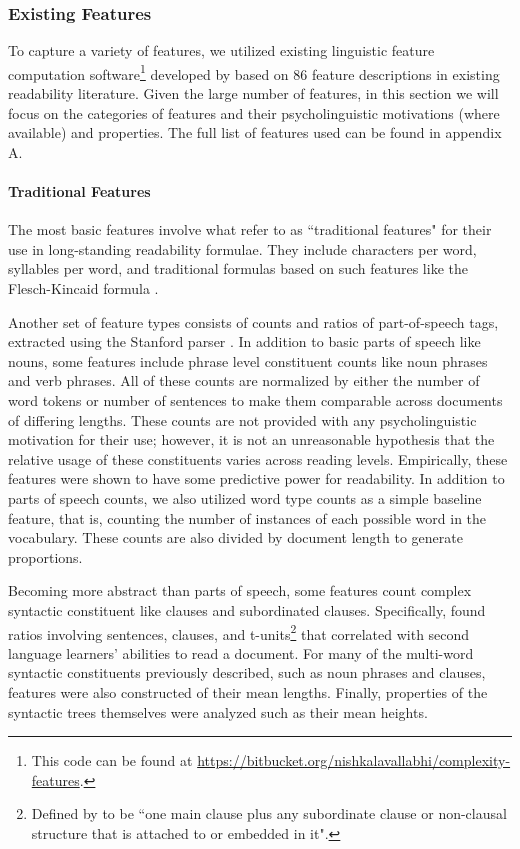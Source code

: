 \documentclass[11pt,a4paper]{article}
\theoremstyle{definition}
\begin{document}
\subsubsection{Existing Features}
To capture a variety of features, we utilized existing linguistic feature computation software\footnote{This code can be found at \url{https://bitbucket.org/nishkalavallabhi/complexity-features}.} developed by \citet{vajjalabalakrishnaAnalyzingTextComplexity2015} based on 86 feature descriptions in existing readability literature. Given the large number of features, in this section we will focus on the categories of features and their psycholinguistic motivations (where available) and properties. The full list of features used can be found in appendix A.

\paragraph{Traditional Features}

The most basic features involve what  \citet{vajjalaImprovingAccuracyReadability2012} refer to as ``traditional features" for their use in long-standing readability formulae. They include characters per word, syllables per word, and traditional formulas based on such features like the Flesch-Kincaid formula \citep{kincaidDerivationNewReadability1975}.

Another set of feature types consists of counts and ratios of part-of-speech tags, extracted using the Stanford parser \citep{kleinAccurateUnlexicalizedParsing2003}. In addition to basic parts of speech like nouns, some features include phrase level constituent counts like noun phrases and verb phrases. All of these counts are normalized by either the number of word tokens or number of sentences to make them comparable across documents of differing lengths. These counts are not provided with any psycholinguistic motivation for their use; however, it is not an unreasonable hypothesis that the relative usage of these constituents varies across reading levels. Empirically, these features were shown to have some predictive power for readability. In addition to parts of speech counts, we also utilized word type counts as a simple baseline feature, that is, counting the number of instances of each possible word in the vocabulary. These counts are also divided by document length to generate proportions.

Becoming more abstract than parts of speech, some features count complex syntactic constituent like clauses and subordinated clauses. Specifically, \citet{luAutomaticAnalysisSyntactic2010} found ratios involving sentences, clauses, and t-units\footnote{Defined by \citet{vajjalaImprovingAccuracyReadability2012} to be ``one main clause plus any subordinate clause or non-clausal structure that is attached to or embedded in it".} that correlated with second language learners' abilities to read a document. For many of the multi-word syntactic constituents previously described, such as noun phrases and clauses, features were also constructed of their mean lengths. Finally, properties of the syntactic trees themselves were analyzed such as their mean heights.
\end{document}
